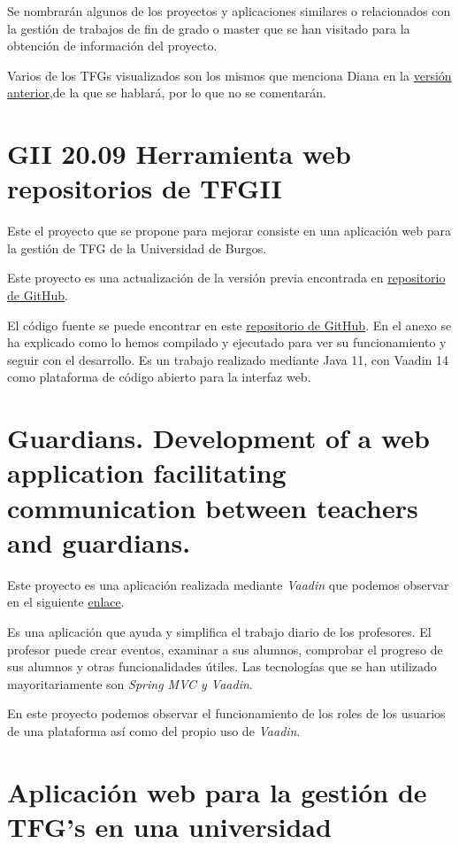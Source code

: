 Se nombrarán algunos de los proyectos y aplicaciones similares o relacionados con la gestión de trabajos de fin de grado o master que se han visitado para la obtención de información del proyecto.

Varios de los TFGs visualizados son los mismos que menciona Diana en la \href{https://github.com/dbo1001/Gestor-TFG-2021}{versión anterior},de la que se hablará, por lo que no se comentarán.  

\section{GII 20.09 Herramienta web repositorios de TFGII}
Este el proyecto que se propone para mejorar consiste en una aplicación web para la gestión de TFG de la Universidad de Burgos.

Este proyecto es una actualización de la versión previa encontrada en \href{https://github.com/jfb0019/Gestor-TFG-2016}{repositorio de GitHub}. 

El código fuente se puede encontrar en este \href{https://github.com/dbo1001/Gestor-TFG-2021}{repositorio de GitHub}. En el anexo se ha explicado como lo hemos compilado y ejecutado para ver su funcionamiento y seguir con el desarrollo. Es un trabajo realizado mediante Java 11, con Vaadin 14 como plataforma de código abierto para la interfaz web. 

\section{Guardians. Development of a web application facilitating communication between teachers and guardians.}

Este proyecto es una aplicación realizada mediante \emph{Vaadin} que podemos observar en el siguiente \href{https://github.com/david-romero/tfg-vaadin}{enlace}.

Es una aplicación que ayuda y simplifica el trabajo diario de los profesores. El profesor puede crear eventos, examinar a sus alumnos, comprobar el progreso de sus alumnos y otras funcionalidades útiles. Las tecnologías que se han utilizado mayoritariamente son \emph{Spring MVC y Vaadin}.

En este proyecto podemos observar el funcionamiento de los roles de los usuarios de una plataforma así como del propio uso de \emph{Vaadin}.

\section{Aplicación web para la gestión de TFG's en una universidad}


